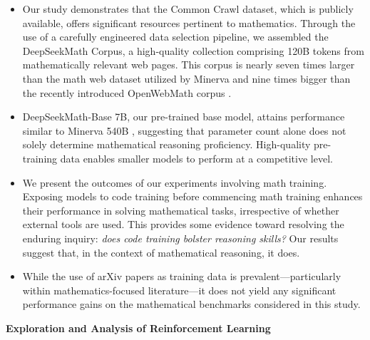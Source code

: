 \begin{itemize}[topsep=0pt]
    \item Our study demonstrates that the Common Crawl dataset, which is publicly available, offers significant resources pertinent to mathematics. Through the use of a carefully engineered data selection pipeline, we assembled the DeepSeekMath Corpus, a high-quality collection comprising 120B tokens from mathematically relevant web pages. This corpus is nearly seven times larger than the math web dataset utilized by Minerva \citep{minerva} and nine times bigger than the recently introduced OpenWebMath corpus \citep{openwebmath}.

\item DeepSeekMath-Base 7B, our pre-trained base model, attains performance similar to Minerva 540B \citep{minerva}, suggesting that parameter count alone does not solely determine mathematical reasoning proficiency. High-quality pre-training data enables smaller models to perform at a competitive level.

\item We present the outcomes of our experiments involving math training. Exposing models to code training before commencing math training enhances their performance in solving mathematical tasks, irrespective of whether external tools are used. This provides some evidence toward resolving the enduring inquiry: \textit{does code training bolster reasoning skills?} Our results suggest that, in the context of mathematical reasoning, it does.

\item While the use of arXiv papers as training data is prevalent—particularly within mathematics-focused literature—it does not yield any significant performance gains on the mathematical benchmarks considered in this study.
\end{itemize}

\textbf{Exploration and Analysis of Reinforcement Learning}

